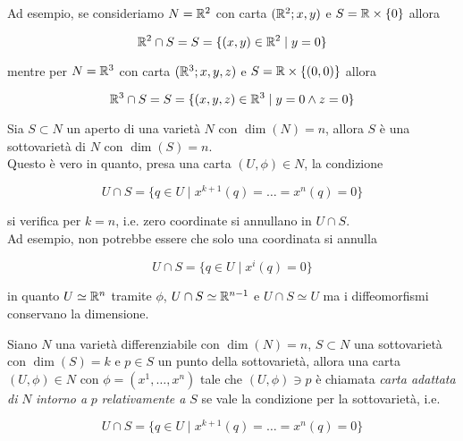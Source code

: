 Ad esempio, se consideriamo $ N = \mathbb{R}^{2} $ con carta $ (\mathbb{R}^{2};x,y) $ e $ S = \mathbb{R} \times \{0\} $ allora

\begin{equation}
	\mathbb{R}^{2} \cap S = S = \{ (x,y) \in \mathbb{R}^{2} \mid y=0 \}
\end{equation}

mentre per $ N = \mathbb{R}^{3} $ con carta $ (\mathbb{R}^{3};x,y,z) $ e $ S = \mathbb{R} \times \{(0,0)\} $ allora

\begin{equation}
	\mathbb{R}^{3} \cap S = S = \{ (x,y,z) \in \mathbb{R}^{3} \mid y = 0 \wedge z = 0 \}
\end{equation}

\begin{remark}\label{subvar-open}
	Sia $ S \subset N $ un aperto di una varietà $ N $ con $ \dim(N)=n $, allora $ S $ è una sottovarietà di $ N $ con $ \dim(S)=n $.\\
	Questo è vero in quanto, presa una carta $ (U,\phi) \in N $, la condizione
	
	\begin{equation}
		U \cap S = \{ q \in U \mid x^{k+1}(q) = \dots = x^{n}(q) = 0 \}
	\end{equation}

	si verifica per $ k=n $, i.e. zero coordinate si annullano in $ U \cap S $.\\
	Ad esempio, non potrebbe essere che solo una coordinata si annulla
	
	\begin{equation}
		U \cap S = \{ q \in U \mid x^{i}(q) = 0 \}
	\end{equation}

	in quanto $ U \simeq \mathbb{R}^{n} $ tramite $ \phi $, $ U \cap S \simeq \mathbb{R}^{n-1} $ e $ U \cap S \simeq U $ ma i diffeomorfismi conservano la dimensione.
\end{remark}

Siano $ N $ una varietà differenziabile con $ \dim(N)=n $, $ S \subset N $ una sottovarietà con $ \dim(S)=k $ e $ p \in S $ un punto della sottovarietà, allora una carta $ (U,\phi) \in N $ con $ \phi = (x^{1},\dots,x^{n}) $ tale che $ (U,\phi) \ni p $ è chiamata \textit{carta adattata di} $ N $ \textit{intorno a} $ p $ \textit{relativamente a} $ S $ se vale la condizione per la sottovarietà, i.e.

\begin{equation}
	U \cap S = \{ q \in U \mid x^{k+1}(q) = \dots = x^{n}(q) = 0 \}
\end{equation}

